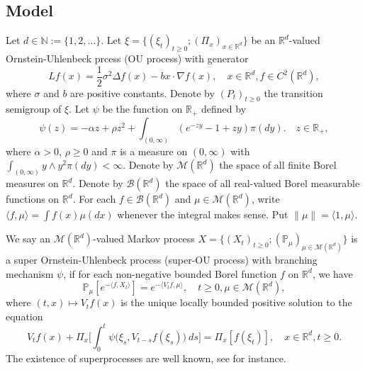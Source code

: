 \documentclass[12pt,a4paper]{amsart}
\theoremstyle{plain}
\theoremstyle{definition}
\numberwithin{equation}{section}
\begin{document}
\subsection{Model}
\label{ss:1.1}
	Let $d \in \mathbb N:= \{1,2,\dots\}$.
    Let $\xi=\{(\xi_t)_{t\geq 0}; (\Pi_x)_{x\in \mathbb R^d}\}$ be an $\mathbb R^d$-valued Ornstein-Uhlenbeck prcess (OU process) with generator
\begin{equation}
\label{eq: OU generator}
    Lf(x)
        = \frac{1}{2}\sigma^2\Delta f(x)-b x \cdot \nabla f(x),
        \quad  x\in \mathbb R^d,
        f \in C^2(\mathbb R^d),
\end{equation}
    where $\sigma$ and $b$ are positive constants.
    Denote by $(P_t)_{t\geq 0}$ the transition semigroup of $\xi$.
    Let $\psi$ be the function on $\mathbb R_+$ defined by
\begin{equation}
\label{mechanism}
       \psi(z)=
    - \alpha z + \rho z^2 + \int_{(0,\infty)} (e^{-zy} - 1 + zy) \pi(dy).
    \quad  z \in \mathbb R_+,
\end{equation}
	where $\alpha > 0 $, $\rho \geq0$ and $\pi$ is a measure on $(0,\infty)$ with $\int_{(0,\infty)}y\wedge y^2 \pi(dy)< \infty$.
    Denote by $\mathcal M(\mathbb R^d)$ the space of all finite Borel measures on $\mathbb R^d$.
    Denote by $\mathcal B(\mathbb R^d)$ the space of all real-valued Borel measurable functions on $\mathbb R^d$.
	For each $f\in \mathcal B(\mathbb R^d)$ and $\mu \in \mathcal M(\mathbb R^d)$, write $\langle f,\mu\rangle = \int f(x)\mu(dx)$ whenever the integral makes sense.
    Put $\|\mu\|=\langle 1,\mu\rangle$.

    We say an $\mathcal M(\mathbb R^d)$-valued Markov process $X = \{(X_t)_{t\geq 0}; (\mathbb{P}_{\mu})_{\mu \in \mathcal M(\mathbb R^d)}\}$ is a super Ornstein-Uhlenbeck process (super-OU process) with branching mechanism $\psi$, if for each non-negative bounded Borel function $f$ on $\mathbb R^d$, we have
\begin{equation} \label{super}
    \mathbb{P}_{\mu}[e^{-\langle f,X_t \rangle}]
    = e^{-\langle V_tf, \mu \rangle},
    \quad t\geq 0, \mu \in \mathcal M(\mathbb R^d),
\end{equation}
	where $(t,x) \mapsto V_tf(x)$ is the unique locally bounded positive solution to the equation
\begin{equation}\label{eq1}
	V_tf(x) + \Pi_x \Big[ \int_0^t\psi\big(\xi_s,V_{t-s}f(\xi_s)\big)~ds\Big]
	= \Pi_x [f(\xi_t)],
    \quad x\in \mathbb R^d, t\geq 0.
\end{equation}	
    The existence of superprocesses are well known, see \cite{Dynkin1993Superprocesses} for instance.
\end{document}
